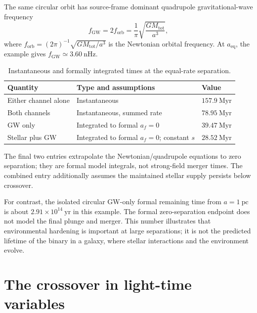 \documentclass[12pt]{article}
\begin{document}
The same circular orbit has source-frame dominant quadrupole gravitational-wave frequency
\begin{equation}
  f_{\mathrm{GW}}=2f_{\mathrm{orb}}
  =\frac{1}{\pi}\sqrt{\frac{GM_{\mathrm{tot}}}{a^3}},
  \label{eq:gw-frequency}
\end{equation}
where $f_{\mathrm{orb}}=(2\pi)^{-1}\sqrt{GM_{\mathrm{tot}}/a^3}$ is the Newtonian orbital frequency. At $a_{\mathrm{eq}}$, the example gives $f_{\mathrm{GW}}\simeq3.60\ \mathrm{nHz}$.

\begin{table}[ht]
  \centering
  \caption{Instantaneous and formally integrated times at the equal-rate separation.}
  \label{tab:crossover-times}
  \begin{tabular}{lll}
    \toprule
    Quantity & Type and assumptions & Value \\
    \midrule
    Either channel alone & Instantaneous & $157.9\ \mathrm{Myr}$ \\
    Both channels & Instantaneous, summed rate & $78.95\ \mathrm{Myr}$ \\
    GW only & Integrated to formal $a_f=0$ & $39.47\ \mathrm{Myr}$ \\
    Stellar plus GW & Integrated to formal $a_f=0$; constant $s$ & $28.52\ \mathrm{Myr}$ \\
    \bottomrule
  \end{tabular}
\end{table}
The final two entries extrapolate the Newtonian/quadrupole equations to zero separation; they are formal model integrals, not strong-field merger times. The combined entry additionally assumes the maintained stellar supply persists below crossover.

For contrast, the isolated circular GW-only formal remaining time from $a=1\ \mathrm{pc}$ is about $2.91\times10^{14}\ \mathrm{yr}$ in this example. The formal zero-separation endpoint does not model the final plunge and merger. This number illustrates that environmental hardening is important at large separations; it is not the predicted lifetime of the binary in a galaxy, where stellar interactions and the environment evolve.

\section{The crossover in light-time variables}
\end{document}
